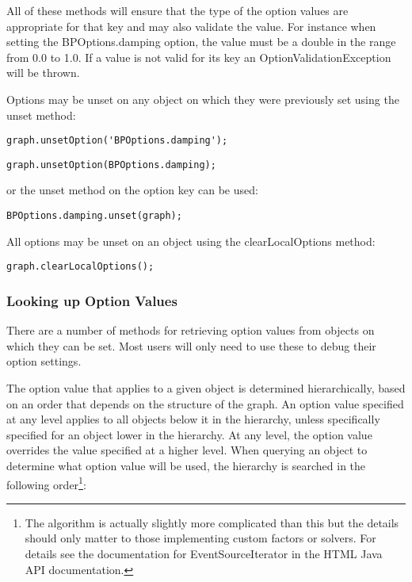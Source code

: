 \fi

All of these methods will ensure that the type of the option values are appropriate for that key and may also validate the value. For instance when setting the BPOptions.damping option, the value must be a double in the range from 0.0 to 1.0. If a value is not valid for its key an OptionValidationException will be thrown.

Options may be unset on any object on which they were previously set using the unset method:

\ifmatlab
\begin{lstlisting}
graph.unsetOption('BPOptions.damping');
\end{lstlisting}
\fi

\ifjava
\begin{lstlisting}
graph.unsetOption(BPOptions.damping);
\end{lstlisting}

or the unset method on the option key can be used:

\begin{lstlisting}
BPOptions.damping.unset(graph);
\end{lstlisting}
\fi

All options may be unset on an object using the clearLocalOptions method:

\begin{lstlisting}
graph.clearLocalOptions();
\end{lstlisting}

\subsubsection{Looking up Option Values}

There are a number of methods for retrieving option values from objects on which they can be set. Most users will only need to use these to debug their option settings.

The option value that applies to a given object is determined hierarchically, based on an order that depends on the structure of the graph.  An option value specified at any level applies to all objects below it in the hierarchy, unless specifically specified for an object lower in the hierarchy.  At any level, the option value overrides the value specified at a higher level.  When querying an object to determine what option value will be used, the hierarchy is searched in the following order\footnote{The algorithm is actually slightly more complicated than this but the details should only matter to those implementing custom factors or solvers. For details see the documentation for EventSourceIterator in the HTML Java API documentation.}:

